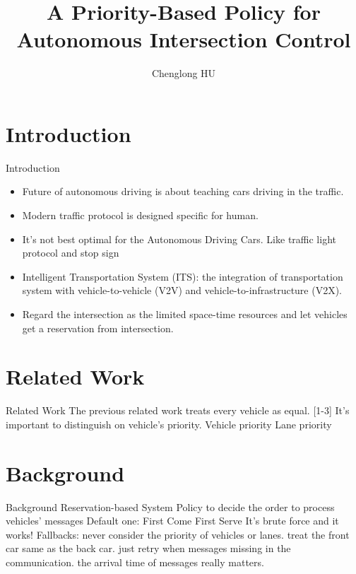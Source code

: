 \documentclass[compress]{beamer}
\title[Priority-based Policy]{A Priority-Based Policy for \\Autonomous Intersection Control}
\author{Chenglong HU}
\institute[Fudan University]{
    School of Computer Science \\
    Fudan University, Shanghai \\
    200433, China
}
\begin{document}
  \begin{frame}
  \titlepage
  \end{frame}
  
\section{Introduction}
  \begin{frame}{Introduction}
    \begin{itemize}
        \item Future of autonomous driving is about teaching cars driving in the traffic.
        \item Modern traffic protocol is designed specific for human.
        \item It’s not best optimal for the Autonomous Driving Cars. Like traffic light protocol and stop sign
        \item Intelligent Transportation System (ITS): the integration of transportation system with vehicle-to-vehicle (V2V) and vehicle-to-infrastructure (V2X).
        \item Regard the intersection as the limited space-time resources and let vehicles get a reservation from intersection.
    \end{itemize}
  \end{frame}
  
\section{Related Work}
  \begin{frame}{Related Work}
    The previous related work treats every vehicle as equal. [1-3]
It’s important to distinguish on vehicle’s priority.
Vehicle priority
Lane priority

  \end{frame}
  
\section{Background}
  \begin{frame}{Background}
    Reservation-based System
    Policy to decide the order to process vehicles’ messages
    Default one: First Come First Serve
    It’s brute force and it works!
    Fallbacks:
    never consider the priority of vehicles or lanes.
    treat the front car same as the back car.
    just retry when messages missing in the communication.
    the arrival time of messages really matters.
  \end{frame}
\end{document}
